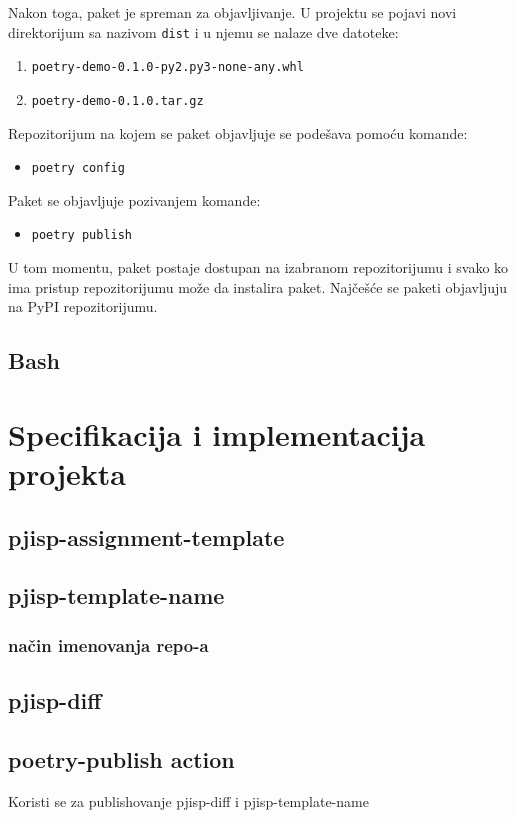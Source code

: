 \documentclass[12pt]{report}
\begin{document}
Nakon toga, paket je spreman za objavljivanje. U projektu se pojavi novi direktorijum sa nazivom \texttt{dist} i u njemu se nalaze dve datoteke:

\begin{enumerate}
    \item \texttt{poetry-demo-0.1.0-py2.py3-none-any.whl}
    \item \texttt{poetry-demo-0.1.0.tar.gz}
\end{enumerate}

Repozitorijum na kojem se paket objavljuje se podešava pomoću komande:

\begin{itemize}
    \item \texttt{poetry config}
\end{itemize}

Paket se objavljuje pozivanjem komande:

\begin{itemize}
    \item \texttt{poetry publish}
\end{itemize}

U tom momentu, paket postaje dostupan na izabranom repozitorijumu i svako ko ima pristup repozitorijumu može da instalira paket. Najčešće se paketi objavljuju na PyPI repozitorijumu.

\section{Bash}

\chapter{Specifikacija i implementacija projekta}
\section{pjisp-assignment-template}
\section{pjisp-template-name}
\subsection{način imenovanja repo-a}
\section{pjisp-diff}
\section{poetry-publish action}
Koristi se za publishovanje pjisp-diff i pjisp-template-name
\end{document}
